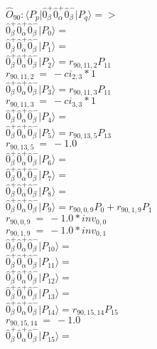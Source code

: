 \documentclass[14pt]{article}
\begin{document}
    $\hat{O}_{90}:  \langle{P_p}\vert \hat{0}_{\beta}^{+}\hat{0}_{\alpha}^{+}\hat{0}_{\beta}^{-} \vert{P_q}\rangle => $ \\ 
    $ \hat{0}_{\beta}^{+}\hat{0}_{\alpha}^{+}\hat{0}_{\beta}^{-} \vert{P_{0}}\rangle =  $ \\ 
    $ \hat{0}_{\beta}^{+}\hat{0}_{\alpha}^{+}\hat{0}_{\beta}^{-} \vert{P_{1}}\rangle =  $ \\ 
    $ \hat{0}_{\beta}^{+}\hat{0}_{\alpha}^{+}\hat{0}_{\beta}^{-} \vert{P_{2}}\rangle = {r}_{90,11,2}P_{11} $ \\ 
    ${r}_{90,11,2}\ =\ -{ci}_{2,3}*1 $ \\ 
    $ \hat{0}_{\beta}^{+}\hat{0}_{\alpha}^{+}\hat{0}_{\beta}^{-} \vert{P_{3}}\rangle = {r}_{90,11,3}P_{11} $ \\ 
    ${r}_{90,11,3}\ =\ -{ci}_{3,3}*1 $ \\ 
    $ \hat{0}_{\beta}^{+}\hat{0}_{\alpha}^{+}\hat{0}_{\beta}^{-} \vert{P_{4}}\rangle =  $ \\ 
    $ \hat{0}_{\beta}^{+}\hat{0}_{\alpha}^{+}\hat{0}_{\beta}^{-} \vert{P_{5}}\rangle = {r}_{90,13,5}P_{13} $ \\ 
    ${r}_{90,13,5}\ =\ -1.0 $ \\ 
    $ \hat{0}_{\beta}^{+}\hat{0}_{\alpha}^{+}\hat{0}_{\beta}^{-} \vert{P_{6}}\rangle =  $ \\ 
    $ \hat{0}_{\beta}^{+}\hat{0}_{\alpha}^{+}\hat{0}_{\beta}^{-} \vert{P_{7}}\rangle =  $ \\ 
    $ \hat{0}_{\beta}^{+}\hat{0}_{\alpha}^{+}\hat{0}_{\beta}^{-} \vert{P_{8}}\rangle =  $ \\ 
    $ \hat{0}_{\beta}^{+}\hat{0}_{\alpha}^{+}\hat{0}_{\beta}^{-} \vert{P_{9}}\rangle = {r}_{90,0,9}P_{0}+{r}_{90,1,9}P_{1} $ \\ 
    ${r}_{90,0,9}\ =\ -1.0*{inv}_{0,0} $ \\ 
    ${r}_{90,1,9}\ =\ -1.0*{inv}_{0,1} $ \\ 
    $ \hat{0}_{\beta}^{+}\hat{0}_{\alpha}^{+}\hat{0}_{\beta}^{-} \vert{P_{10}}\rangle =  $ \\ 
    $ \hat{0}_{\beta}^{+}\hat{0}_{\alpha}^{+}\hat{0}_{\beta}^{-} \vert{P_{11}}\rangle =  $ \\ 
    $ \hat{0}_{\beta}^{+}\hat{0}_{\alpha}^{+}\hat{0}_{\beta}^{-} \vert{P_{12}}\rangle =  $ \\ 
    $ \hat{0}_{\beta}^{+}\hat{0}_{\alpha}^{+}\hat{0}_{\beta}^{-} \vert{P_{13}}\rangle =  $ \\ 
    $ \hat{0}_{\beta}^{+}\hat{0}_{\alpha}^{+}\hat{0}_{\beta}^{-} \vert{P_{14}}\rangle = {r}_{90,15,14}P_{15} $ \\ 
    ${r}_{90,15,14}\ =\ -1.0 $ \\ 
    $ \hat{0}_{\beta}^{+}\hat{0}_{\alpha}^{+}\hat{0}_{\beta}^{-} \vert{P_{15}}\rangle =  $ \\ 
    
\end{document}
